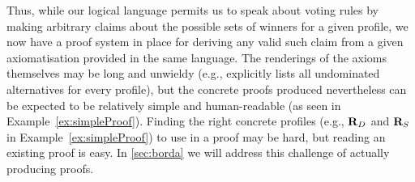 \documentclass{comsoc2016}
\begin{document}
Thus, while our logical language permits us to speak about voting rules by making arbitrary claims about the possible sets of winners for a given profile, we now have a proof system in place for deriving any valid such claim from a given axiomatisation provided in the same language. The renderings of the axioms themselves may be long and unwieldy (e.g.,  explicitly lists all undominated alternatives for every profile), but the concrete proofs produced nevertheless can be expected to be relatively simple and human-readable (as seen in Example~\ref{ex:simpleProof}). Finding the right concrete profiles (e.g., $\mathbf{R}_D$ and $\mathbf{R}_S$ in Example~\ref{ex:simpleProof}) to use in a proof may be hard, but reading an existing proof is easy. In \cref{sec:borda} we will address this challenge of actually producing proofs.
\end{document}
